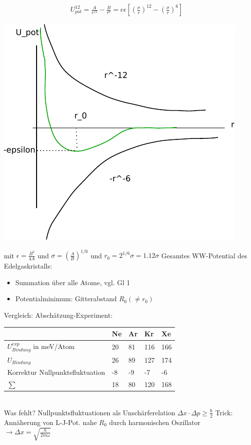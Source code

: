 	\begin{align*}
		U_{pot}^{12}=\frac{A}{r^{12}}-\frac{B}{r^6} = e\epsilon\left[\left(\frac{\sigma}{r}\right)^{12} - \left(\frac{\sigma}{r}\right)^{6}\right]
	\end{align*}
	\begin{center}
		\includegraphics{figures/1_2graph.pdf}
	\end{center}
	mit $\epsilon = \frac{B^2}{4A}$ und $\sigma = \left(\frac{A}{B}\right)^{1/6}$\newline
	und $r_0 = 2^{1/6}\sigma=1.12\sigma$\newline
	Gesamtes WW-Potential des Edelgaskristalls:
	\begin{itemize}
		\item Summation über alle Atome, vgl. Gl 1
		\item Potentialminimum: Gitterabstand $R_0 (\neq r_0)$
	\end{itemize}
	Vergleich: Abschätzung-Experiment:
	\begin{table}[h]
		\centering
		\begin{tabular}{l|llll}
													& Ne & Ar & Kr  & Xe  \\ \hline
			$U_{Bindung}^{exp}$ in meV/Atom & 20 & 81 & 116 & 166 \\
			$U_{Bindung}$                             & 26 & 89 & 127 & 174 \\
			Korrektur Nullpunktsfluktuation          & -8 & -9 & -7  & -6  \\
			$\sum$                                   & 18 & 80 & 120 & 168
		\end{tabular}
	\end{table}\\
	Was fehlt? Nullpunktsfluktuationen als Unschärferelation $\Delta x\cdot \Delta p \geq \frac{\hbar}{2}$\newline
	Trick: Annäherung von L-J-Pot. nahe $R_0$ durch harmonischen Oszillator \newline
	$\rightarrow \Delta x = \sqrt{\frac{h}{2m\omega}}$

